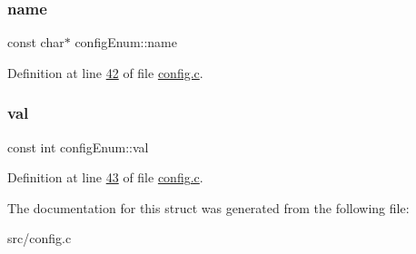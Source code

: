 \subsubsection{\texorpdfstring{name}{name}}
{\footnotesize\ttfamily const char$\ast$ config\+Enum\+::name}



Definition at line \hyperlink{config_8c_source_l00042}{42} of file \hyperlink{config_8c_source}{config.\+c}.

\mbox{\label{structconfigEnum_ac241b68cfa212a23daac1b48de339aa6}} 
\subsubsection{\texorpdfstring{val}{val}}
{\footnotesize\ttfamily const int config\+Enum\+::val}



Definition at line \hyperlink{config_8c_source_l00043}{43} of file \hyperlink{config_8c_source}{config.\+c}.



The documentation for this struct was generated from the following file\+:\begin{DoxyCompactItemize}
\item 
src/config.\+c\end{DoxyCompactItemize}
